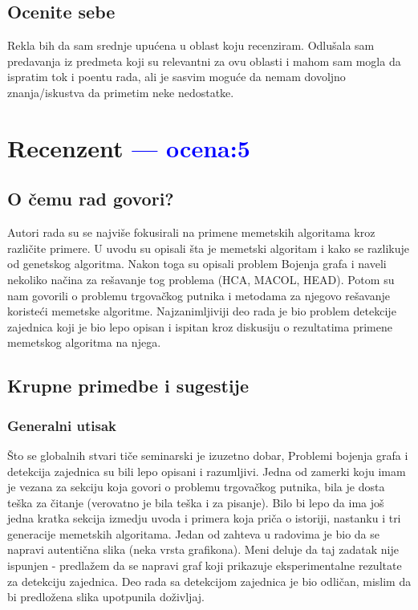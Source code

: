 \documentclass[a4paper]{report}
\newcommand{\odgovor}[1]{\textcolor{blue}{#1}}
\begin{document}
\section{Ocenite sebe}
Rekla bih da sam srednje upućena u oblast koju recenziram. Odlušala sam predavanja iz predmeta koji su relevantni za ovu oblasti i mahom sam mogla da ispratim tok i poentu rada, ali je sasvim moguće da nemam dovoljno znanja/iskustva da primetim neke nedostatke.

\chapter{Recenzent \odgovor{--- ocena:5} }


\section{O čemu rad govori?}
Autori rada su se najviše fokusirali na primene memetskih algoritama kroz različite primere. U uvodu su opisali šta je memetski algoritam i kako se razlikuje od genetskog algoritma. Nakon toga su opisali problem Bojenja grafa i naveli nekoliko načina za rešavanje tog problema (HCA, MACOL, HEAD). Potom su nam govorili o problemu trgovačkog putnika i metodama za njegovo rešavanje koristeći memetske algoritme. Najzanimljiviji deo rada je bio problem detekcije zajednica koji je bio lepo opisan i ispitan kroz diskusiju o rezultatima primene memetskog algoritma na njega.

\section{Krupne primedbe i sugestije}

\subsection{Generalni utisak}
Što se globalnih stvari tiče seminarski je izuzetno dobar, Problemi bojenja grafa i detekcija zajednica su bili lepo opisani i razumljivi. Jedna od zamerki koju imam je vezana za sekciju koja govori o problemu trgovačkog putnika, bila je dosta teška za čitanje (verovatno je bila teška i za pisanje).
Bilo bi lepo da ima još jedna kratka sekcija izmedju uvoda i primera koja priča o istoriji, nastanku i tri generacije memetskih algoritama.
Jedan od zahteva u radovima je bio da se napravi autentična slika (neka vrsta grafikona). Meni deluje da taj zadatak nije ispunjen - predlažem da se napravi graf koji prikazuje eksperimentalne rezultate za detekciju zajednica. Deo rada sa detekcijom zajednica je bio odličan, mislim da bi predložena slika upotpunila doživljaj.
\end{document}
